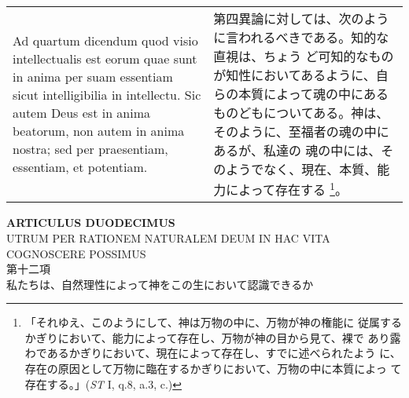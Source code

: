 \documentclass[10pt]{jsarticle} %
\begin{document}
\begin{longtable}{p{21em}p{21em}}
\\

{\sc Ad quartum dicendum} quod visio intellectualis est eorum quae
sunt in anima per suam essentiam sicut intelligibilia in
intellectu. Sic autem Deus est in anima beatorum, non autem in anima
nostra; sed per praesentiam, essentiam, et potentiam.

&

第四異論に対しては、次のように言われるべきである。知的な直視は、ちょう
ど可知的なものが知性においてあるように、自らの本質によって魂の中にある
ものどもについてある。神は、そのように、至福者の魂の中にあるが、私達の
魂の中には、そのようでなく、現在、本質、能力によって存在する
\footnote{「それゆえ、このようにして、神は万物の中に、万物が神の権能に
従属するかぎりにおいて、能力によって存在し、万物が神の目から見て、裸で
あり露わであるかぎりにおいて、現在によって存在し、すでに述べられたよう
に、存在の原因として万物に臨在するかぎりにおいて、万物の中に本質によっ
て存在する。」({\it ST} I, q.8, a.3, c.)}。

\end{longtable}

\newpage
{}

\begin{center}
 {\Large {\bf ARTICULUS DUODECIMUS}}\\
{\large UTRUM PER RATIONEM NATURALEM DEUM IN HAC VITA\\COGNOSCERE POSSIMUS}\\
{\large 第十二項\\私たちは、自然理性によって神をこの生において認識できるか}

\end{center}
\end{document}
